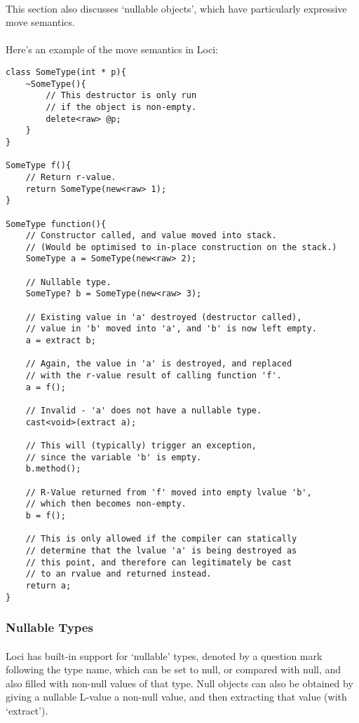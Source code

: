 \documentclass[12pt,twoside,notitlepage]{report}
\begin{document}
\paragraph{}
This section also discusses `nullable objects', which have particularly expressive move semantics.

\paragraph{}
Here's an example of the move semantics in Loci:

\begin{lstlisting}
class SomeType(int * p){
	~SomeType(){
		// This destructor is only run
		// if the object is non-empty.
		delete<raw> @p;
	}
}

SomeType f(){
	// Return r-value.
	return SomeType(new<raw> 1);
}

SomeType function(){
	// Constructor called, and value moved into stack.
	// (Would be optimised to in-place construction on the stack.)
	SomeType a = SomeType(new<raw> 2);
	
	// Nullable type.
	SomeType? b = SomeType(new<raw> 3);
	
	// Existing value in 'a' destroyed (destructor called),
	// value in 'b' moved into 'a', and 'b' is now left empty.
	a = extract b;
	
	// Again, the value in 'a' is destroyed, and replaced
	// with the r-value result of calling function 'f'.
	a = f();
	
	// Invalid - 'a' does not have a nullable type.
	cast<void>(extract a);
	
	// This will (typically) trigger an exception,
	// since the variable 'b' is empty.
	b.method();
	
	// R-Value returned from 'f' moved into empty lvalue 'b',
	// which then becomes non-empty.
	b = f();
	
	// This is only allowed if the compiler can statically
	// determine that the lvalue 'a' is being destroyed as
	// this point, and therefore can legitimately be cast
	// to an rvalue and returned instead.
	return a;
}
\end{lstlisting}


\subsubsection{Nullable Types}

\paragraph{}
Loci has built-in support for `nullable' types, denoted by a question mark following the type name, which can be set to null, or compared with null, and also filled with non-null values of that type. Null objects can also be obtained by giving a nullable L-value a non-null value, and then extracting that value (with `extract').
\end{document}
